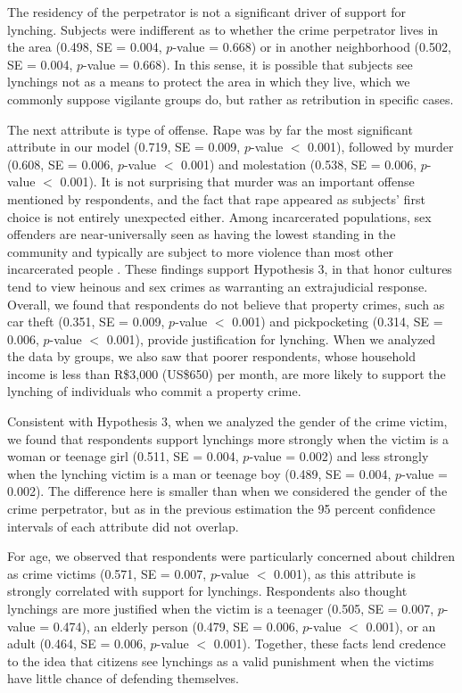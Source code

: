 \documentclass[12pt,ansiapaper]{article}
\begin{document}
The residency of the perpetrator is not a significant driver of support for lynching. Subjects were indifferent as to whether the crime perpetrator lives in the area (0.498, SE = 0.004, $p$-value = 0.668) or in another neighborhood (0.502, SE = 0.004, $p$-value = 0.668). In this sense, it is possible that subjects see lynchings not as a means to protect the area in which they live, which we commonly suppose vigilante groups do, but rather as retribution in specific cases. 

The next attribute is type of offense. Rape was by far the most significant attribute in our model (0.719, SE = 0.009, $p$-value $<$ 0.001), followed by murder (0.608, SE = 0.006, $p$-value $<$ 0.001) and molestation (0.538, SE = 0.006, $p$-value $<$ 0.001). It is not surprising that murder was an important offense mentioned by respondents, and the fact that rape appeared as subjects' first choice is not entirely unexpected either. Among incarcerated populations, sex offenders are near-universally seen as having the lowest standing in the community and typically are subject to more violence than most other incarcerated people \citep{fleisher2009myth}. These findings support Hypothesis 3, in that honor cultures tend to view heinous and sex crimes as warranting an extrajudicial response. Overall, we found that respondents do not believe that property crimes, such as car theft (0.351, SE = 0.009, $p$-value $<$ 0.001) and pickpocketing (0.314, SE = 0.006, $p$-value $<$ 0.001), provide justification for lynching. When we analyzed the data by groups, we also saw that poorer respondents, whose household income is less than R\$3,000 (US\$650) per month, are more likely to support the lynching of individuals who commit a property crime. 

Consistent with Hypothesis 3, when we analyzed the gender of the crime victim, we found that respondents support lynchings more strongly when the victim is a woman or teenage girl (0.511, SE = 0.004, $p$-value = 0.002) and less strongly when the lynching victim is a man or teenage boy (0.489, SE = 0.004, $p$-value = 0.002). The difference here is smaller than when we considered the gender of the crime perpetrator, but as in the previous estimation the 95 percent confidence intervals of each attribute did not overlap. 

For age, we observed that respondents were particularly concerned about children as crime victims (0.571, SE = 0.007, $p$-value $<$ 0.001), as this attribute is strongly correlated with support for lynchings. Respondents also thought lynchings are more justified when the victim is a teenager (0.505, SE = 0.007, $p$-value = 0.474), an elderly person (0.479, SE = 0.006, $p$-value $<$ 0.001), or an adult (0.464, SE = 0.006, $p$-value $<$ 0.001). Together, these facts lend credence to the idea that citizens see lynchings as a valid punishment when the victims have little chance of defending themselves.
\end{document}
